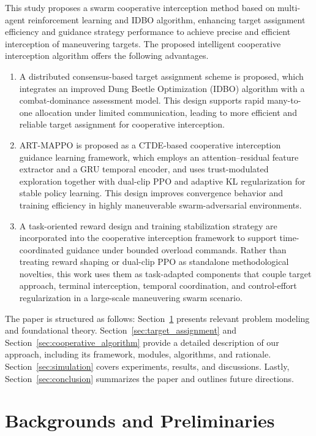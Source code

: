\documentclass[lettersize,journal]{IEEEtran}
\begin{document}
This study proposes a swarm cooperative interception method based on multi-agent reinforcement
learning and IDBO algorithm, enhancing target assignment efficiency and guidance strategy
performance to achieve precise and efficient interception of maneuvering targets.
The proposed intelligent cooperative interception algorithm offers the following advantages.

\begin{enumerate}
\item A distributed consensus-based target assignment scheme is proposed, which integrates an
improved Dung Beetle Optimization (IDBO) algorithm with a combat-dominance assessment model.
This design supports rapid many-to-one allocation under limited communication, leading to more
efficient and reliable target assignment for cooperative interception.

\item ART-MAPPO is proposed as a CTDE-based cooperative interception guidance learning
framework, which employs an attention--residual feature extractor and a GRU temporal encoder,
and uses trust-modulated exploration together with dual-clip PPO and adaptive KL
regularization for stable policy learning. This design improves convergence behavior and
training efficiency in highly maneuverable swarm-adversarial environments.

\item A task-oriented reward design and training stabilization strategy are incorporated into
the cooperative interception framework to support time-coordinated guidance under bounded
overload commands. Rather than treating reward shaping or dual-clip PPO as standalone
methodological novelties, this work uses them as task-adapted components that couple target
approach, terminal interception, temporal coordination, and control-effort regularization in a
large-scale maneuvering swarm scenario.
\end{enumerate}

The paper is structured as follows: Section~\ref{sec:method} presents relevant problem modeling and foundational theory. Section~\ref{sec:target_assignment} and Section~\ref{sec:cooperative_algorithm} provide a detailed description of our approach, including its framework, modules, algorithms, and rationale. Section~\ref{sec:simulation} covers experiments, results, and discussions. Lastly, Section~\ref{sec:conclusion} summarizes the paper and outlines future directions.

\section{Backgrounds and Preliminaries}
\label{sec:method}
\end{document}
